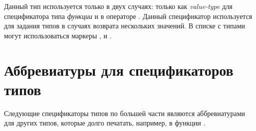 \begin{flushdesc}
\item[\cd{(values \emph{value-type-1} \emph{value-type-2} ...)}]
  Данный тип используется только в двух случаях: только как \emph{value-type}
  для спецификатора типа \emph{функции} и в операторе . Данный
  спецификатор используется для задания типов в случаях возврата нескольких
  значений.
  В списке с типами могут использоваться маркеры ,  и
  .
\end{flushdesc}

\section{Аббревиатуры для спецификаторов типов}

Следующие спецификаторы типов по большей части являются аббревиатурами для других
типов, которые долго печатать, например, в функции .
